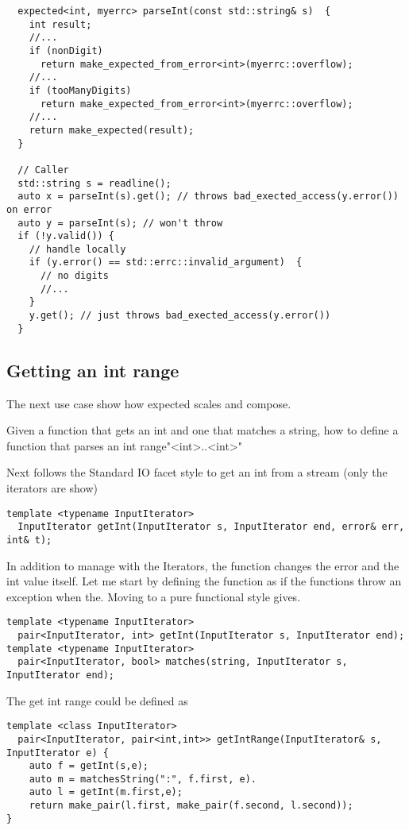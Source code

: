 \documentclass[a4paper,10pt]{article}
\begin{document}
\begin{lstlisting}
  expected<int, myerrc> parseInt(const std::string& s)  {
    int result;
    //...
    if (nonDigit)  
      return make_expected_from_error<int>(myerrc::overflow);
    //...
    if (tooManyDigits)  
      return make_expected_from_error<int>(myerrc::overflow);
    //...
    return make_expected(result);
  }

  // Caller
  std::string s = readline();
  auto x = parseInt(s).get(); // throws bad_exected_access(y.error()) on error
  auto y = parseInt(s); // won't throw
  if (!y.valid()) {
    // handle locally
    if (y.error() == std::errc::invalid_argument)  {
      // no digits
      //...
    }
    y.get(); // just throws bad_exected_access(y.error())
  }
\end{lstlisting}

\subsection{Getting an int range}

The next use case show how expected scales and compose. 

Given a function that gets an int and one that matches a string, how to define a function that parses an int range"<int>..<int>"

Next follows the Standard IO facet style to get an int from a stream (only the iterators are show)

\begin{lstlisting}
template <typename InputIterator>
  InputIterator getInt(InputIterator s, InputIterator end, error& err, int& t);
\end{lstlisting}

In addition to manage with the Iterators, the function changes the error and the int value itself. Let me start by defining the function as if the functions throw an exception when the. Moving to a pure functional style gives.

\begin{lstlisting}
template <typename InputIterator>
  pair<InputIterator, int> getInt(InputIterator s, InputIterator end);
template <typename InputIterator>
  pair<InputIterator, bool> matches(string, InputIterator s, InputIterator end);
\end{lstlisting}

The get int range could be defined as

\begin{lstlisting}
template <class InputIterator>
  pair<InputIterator, pair<int,int>> getIntRange(InputIterator& s, InputIterator e) {
    auto f = getInt(s,e);
    auto m = matchesString(":", f.first, e).
    auto l = getInt(m.first,e);       
    return make_pair(l.first, make_pair(f.second, l.second));
}
\end{lstlisting}
\end{document}
